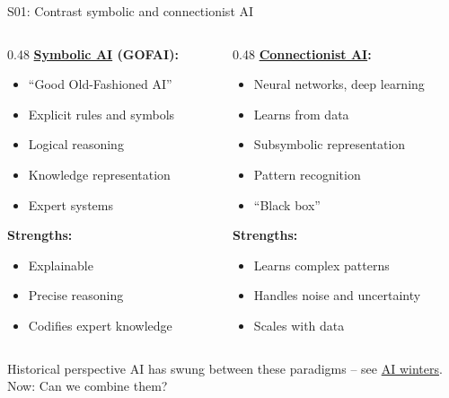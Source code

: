 \documentclass[aspectratio=169, 10pt]{beamer}
\begin{document}
\begin{frame}{S01: Contrast symbolic and connectionist AI}
    \begin{columns}[T]
        \begin{column}{0.48\textwidth}
            \textbf{\href{https://en.wikipedia.org/wiki/Symbolic_artificial_intelligence}{Symbolic AI} (GOFAI):}
            \begin{itemize}
                \item ``Good Old-Fashioned AI''
                \item Explicit rules and symbols
                \item Logical reasoning
                \item Knowledge representation
                \item Expert systems
            \end{itemize}
            
            \vspace{0.3cm}
            \textbf{Strengths:}
            \begin{itemize}
                \item Explainable
                \item Precise reasoning
                \item Codifies expert knowledge
            \end{itemize}
        \end{column}
        \begin{column}{0.48\textwidth}
            \textbf{\href{https://en.wikipedia.org/wiki/Connectionism}{Connectionist AI}:}
            \begin{itemize}
                \item Neural networks, deep learning
                \item Learns from data
                \item Subsymbolic representation
                \item Pattern recognition
                \item ``Black box''
            \end{itemize}
            
            \vspace{0.3cm}
            \textbf{Strengths:}
            \begin{itemize}
                \item Learns complex patterns
                \item Handles noise and uncertainty
                \item Scales with data
            \end{itemize}
        \end{column}
    \end{columns}
    
    \vspace{0.15cm}
    \begin{block}{Historical perspective}
        AI has swung between these paradigms -- see \href{https://en.wikipedia.org/wiki/AI_winter}{AI winters}. Now: Can we combine them?
    \end{block}
\end{frame}
\end{document}

